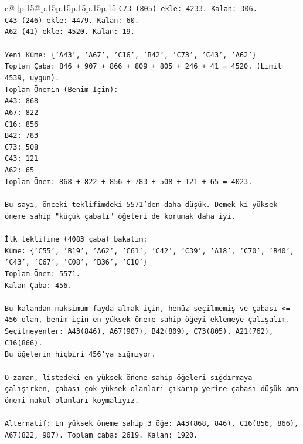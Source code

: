 \documentclass{article}
\begin{document}
{\begin{supertabular}{c@{$\;$}|p{.15\linewidth}@{}p{.15\linewidth}p{.15\linewidth}p{.15\linewidth}p{.15\linewidth}p{.15\linewidth}}
{{{\texttt{C73 (805) ekle: 4233. Kalan: 306.} \\
\texttt{C43 (246) ekle: 4479. Kalan: 60.} \\
\texttt{A62 (41) ekle: 4520. Kalan: 19.} \\
\\ 
\texttt{Yeni Küme: \{'A43', 'A67', 'C16', 'B42', 'C73', 'C43', 'A62'\}} \\
\texttt{Toplam Çaba: 846 + 907 + 866 + 809 + 805 + 246 + 41 = 4520. (Limit 4539, uygun).} \\
\texttt{Toplam Önemin (Benim İçin):} \\
\texttt{A43: 868} \\
\texttt{A67: 822} \\
\texttt{C16: 856} \\
\texttt{B42: 783} \\
\texttt{C73: 508} \\
\texttt{C43: 121} \\
\texttt{A62: 65} \\
\texttt{Toplam Önem: 868 + 822 + 856 + 783 + 508 + 121 + 65 = 4023.} \\
\\ 
\texttt{Bu sayı, önceki teklifimdeki 5571'den daha düşük. Demek ki yüksek öneme sahip "küçük çabalı" öğeleri de korumak daha iyi.} \\
\\ 
\texttt{İlk teklifime (4083 çaba) bakalım:} \\
\texttt{Küme: \{'C55', 'B19', 'A62', 'C61', 'C42', 'C39', 'A18', 'C70', 'B40', 'C43', 'C67', 'C08', 'B36', 'C10'\}} \\
\texttt{Toplam Önem: 5571.} \\
\texttt{Kalan Çaba: 456.} \\
\\ 
\texttt{Bu kalandan maksimum fayda almak için, henüz seçilmemiş ve çabası <= 456 olan, benim için en yüksek öneme sahip öğeyi eklemeye çalışalım.} \\
\texttt{Seçilmeyenler: A43(846), A67(907), B42(809), C73(805), A21(762), C16(866).} \\
\texttt{Bu öğelerin hiçbiri 456'ya sığmıyor.} \\
\\ 
\texttt{O zaman, listedeki en yüksek öneme sahip öğeleri sığdırmaya çalışırken, çabası çok yüksek olanları çıkarıp yerine çabası düşük ama önemi makul olanları koymalıyız.} \\
\\ 
\texttt{Alternatif: En yüksek öneme sahip 3 öğe: A43(868, 846), C16(856, 866), A67(822, 907). Toplam çaba: 2619. Kalan: 1920.} \\
}}}
\end{supertabular}}
\end{document}
